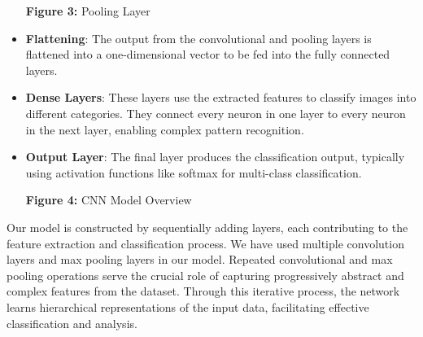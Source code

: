\documentclass[conference]{IEEEtran}
\begin{document}
\begin{itemize}
    \vspace{\baselineskip}

    \begin{center}

      \vspace{\baselineskip}

      \textbf{Figure 3:} Pooling Layer
    \end{center}

    \vspace{\baselineskip}

    \item \textbf{Flattening}: The output from the convolutional and pooling layers is flattened into a one-dimensional vector to be fed into the fully connected layers.
    
    \vspace{\baselineskip}

    \item \textbf{Dense Layers}: These layers use the extracted features to classify images into different categories. They connect every neuron in one layer to every neuron in the next layer, enabling complex pattern recognition.
    
    \vspace{\baselineskip}

    \item \textbf{Output Layer}: The final layer produces the classification output, typically using activation functions like softmax for multi-class classification.
    
    \vspace{\baselineskip}

    \begin{center}

      \vspace{\baselineskip}

      \textbf{Figure 4:} CNN Model Overview
    \end{center}

    \vspace{\baselineskip}

\end{itemize}

Our model is constructed by sequentially adding layers, each contributing to the feature extraction and classification process. We have used multiple convolution layers and max pooling layers in our model. Repeated convolutional and max pooling operations serve the crucial role of capturing progressively abstract and complex features from the dataset. Through this iterative process, the network learns hierarchical representations of the input data, facilitating effective classification and analysis.
\end{document}
